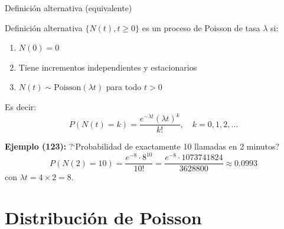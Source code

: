 \documentclass[aspectratio=1610, 9pt]{beamer}
\begin{document}
\begin{frame}{Definici\'{o}n alternativa (equivalente)}

\begin{block}{Definici\'{o}n alternativa}
$\{N(t), t \geq 0\}$ es un proceso de Poisson de tasa $\lambda$ si:
\begin{enumerate}
    \item $N(0) = 0$
    \item Tiene incrementos independientes y estacionarios
    \item $N(t) \sim \text{Poisson}(\lambda t)$ para todo $t > 0$
\end{enumerate}
\end{block}

\vspace{0.3cm}
Es decir:
\[
P(N(t) = k) = \frac{e^{-\lambda t}(\lambda t)^k}{k!}, \quad k = 0, 1, 2, \ldots
\]

\vspace{0.3cm}
\textbf{Ejemplo (123):} ?`Probabilidad de exactamente 10 llamadas en 2 minutos?
\[
P(N(2) = 10) = \frac{e^{-8} \cdot 8^{10}}{10!} = \frac{e^{-8} \cdot 1073741824}{3628800} \approx 0.0993
\]
con $\lambda t = 4 \times 2 = 8$.
\end{frame}

\section{Distribuci\'{o}n de Poisson}
\end{document}
